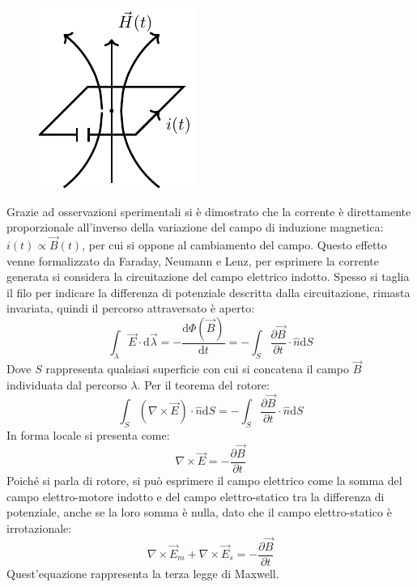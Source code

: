 \documentclass{article}
\newcommand{\df}{\mathrm{d}}
\numberwithin{equation}{subsection}
\begin{document}
\begin{figure}[H]%
    \centering
    \includegraphics{terza-legge-maxwell.pdf}
    \label{fig:terza-legge-maxwell}
\end{figure}

Grazie ad osservazioni sperimentali si è dimostrato che la corrente è direttamente proporzionale all'inverso della variazione del campo di induzione magnetica: 
$i(t)\propto\vec{B}(t)$, per cui si oppone al cambiamento del campo. Questo effetto venne formalizzato da Faraday, Neumann e Lenz, per esprimere la corrente generata 
si considera la circuitazione del campo elettrico indotto. Spesso si taglia il filo per indicare la differenza di potenziale descritta dalla circuitazione, rimasta invariata, 
quindi il percorso attraversato è aperto: 
\begin{equation*}
    \displaystyle\int_{\lambda}\vec{E}\cdot \df\vec{\lambda}=-\frac{\df\Phi(\vec{B})}{\df t}=-\int_S\frac{\partial \vec{B}}{\partial t}\cdot\hat{n}\df S
\end{equation*}
Dove $S$ rappresenta qualsiasi superficie con cui si concatena il campo $\vec{B}$ individuata dal percorso $\lambda$. Per il teorema del rotore:
\begin{equation}
    \displaystyle\int_S(\nabla\times\vec{E})\cdot\hat{n}\df S=-\int_S\frac{\partial \vec{B}}{\partial t}\cdot\hat{n}\df S
\end{equation}
In forma locale si presenta come:
\begin{equation*}
    \nabla\times\vec{E}=\displaystyle-\frac{\partial \vec{B}}{\partial t}
\end{equation*}
Poiché si parla di rotore, si può esprimere il campo elettrico come la somma del campo elettro-motore indotto e del campo elettro-statico tra la differenza di potenziale, 
anche se la loro somma è nulla, dato che il campo elettro-statico è irrotazionale:
\begin{equation}
    \nabla\times\vec{E}_m+\nabla\times\vec{E}_s=-\displaystyle\frac{\partial \vec{B}}{\partial t}
\end{equation} 
Quest'equazione rappresenta la terza legge di Maxwell. 
\end{document}
